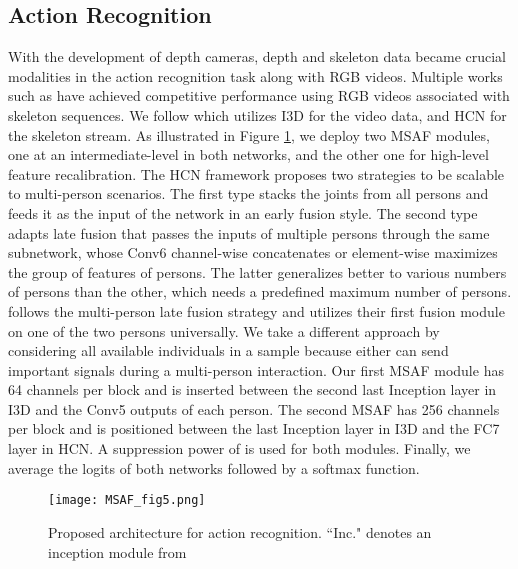 \documentclass[10pt,twocolumn,letterpaper]{article}
\begin{document}
\subsection{Action Recognition}
With the development of depth cameras, depth and skeleton data became crucial modalities in the action recognition task along with RGB videos. Multiple works such as \cite{joze2020mmtm, li2020sgm, liu2018recognizing} have achieved competitive performance using RGB videos associated with skeleton sequences. We follow \cite{joze2020mmtm} which utilizes I3D \cite{carreira2017quo} for the video data, and HCN \cite{ijcai2018-0109} for the skeleton stream. As illustrated in Figure \ref{fig5}, we deploy two MSAF modules, one at an intermediate-level in both networks, and the other one for high-level feature recalibration. The HCN framework proposes two strategies to be scalable to multi-person scenarios. The first type stacks the joints from all persons and feeds it as the input of the network in an early fusion style. The second type adapts late fusion that passes the inputs of multiple persons through the same subnetwork, whose Conv6 channel-wise concatenates or element-wise maximizes the group of features of persons. The latter generalizes better to various numbers of persons than the other, which needs a predefined maximum number of persons. \cite{joze2020mmtm} follows the multi-person late fusion strategy and utilizes their first fusion module on one of the two persons universally. We take a different approach by considering all available individuals in a sample because either can send important signals during a multi-person interaction. Our first MSAF module has 64 channels per block and is inserted between the second last Inception layer in I3D and the Conv5 outputs of each person. The second MSAF has 256 channels per block and is positioned between the last Inception layer in I3D and the FC7 layer in HCN. A suppression power of  is used for both modules. Finally, we average the logits of both networks followed by a softmax function. 

\begin{figure}[t]
\centering
\texttt{[image: MSAF\_fig5.png]} \caption{Proposed architecture for action recognition. ``Inc." denotes an inception module from \cite{carreira2017quo}}
\label{fig5}
\end{figure}
\end{document}

